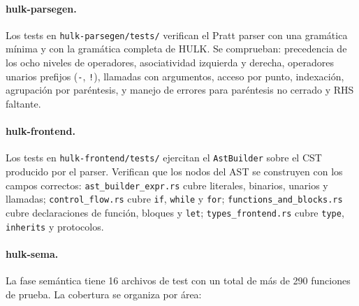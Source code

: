\documentclass[12pt,letterpaper]{article}
\newcommand{\hulk}{\textsc{HULK}}
\newcommand{\src}[1]{\texttt{#1}}
\begin{document}
\paragraph{hulk-parsegen.}
Los tests en \src{hulk-parsegen/tests/} verifican el Pratt parser con una gramática mínima y con la gramática completa de \hulk{}. Se comprueban: precedencia de los ocho niveles de operadores, asociatividad izquierda y derecha, operadores unarios prefijos (\src{-}, \src{!}), llamadas con argumentos, acceso por punto, indexación, agrupación por paréntesis, y manejo de errores para paréntesis no cerrado y RHS faltante.

\paragraph{hulk-frontend.}
Los tests en \src{hulk-frontend/tests/} ejercitan el \src{AstBuilder} sobre el CST producido por el parser. Verifican que los nodos del AST se construyen con los campos correctos: \src{ast\_builder\_expr.rs} cubre literales, binarios, unarios y llamadas; \src{control\_flow.rs} cubre \src{if}, \src{while} y \src{for}; \src{functions\_and\_blocks.rs} cubre declaraciones de función, bloques y \src{let}; \src{types\_frontend.rs} cubre \src{type}, \src{inherits} y protocolos.

\paragraph{hulk-sema.}
La fase semántica tiene 16 archivos de test con un total de más de 290 funciones de prueba. La cobertura se organiza por área:
\end{document}
